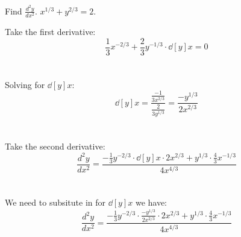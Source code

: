 \documentclass[nooutcomes,handout]{ximera}
\begin{document}
\begin{problem}

Find $\frac{d^2y}{dx^2}$.  $x^{1/3}+y^{2/3}=2$.
	\begin{freeResponse}	

	Take the first derivative:\\
	 $$\frac{1}{3}x^{-2/3}+\frac{2}{3}y^{-1/3}\cdot \dd[y]{x}=0 $$ \\\\
	Solving for $\dd[y]{x}$:\\
	$$\dd[y]{x}=\frac{\frac{-1}{3x^{2/3}}}{\frac{2}{3y^{1/3}}}=\frac{-y^{1/3}}{2x^{2/3}}$$\\\\
	Take the second derivative:
	$$ \frac{d^2y}{dx^2}= \frac{-\frac{1}{3}y^{-2/3} \cdot \dd[y]{x} \cdot 2x^{2/3}+y^{1/3}\cdot \frac{4}{3}x^{-1/3}}{4x^{4/3}}$$ \\\\
	We need to subsitute in for $\dd[y]{x}$ we have:\\ 
	$$ \frac{d^2y}{dx^2}= \frac{-\frac{1}{3}y^{-2/3} \cdot \frac{-y^{1/3}}{2x^{2/3}}  \cdot 2x^{2/3}+y^{1/3}\cdot \frac{4}{3}x^{-1/3}}{4x^{4/3}}$$ \\\\
	
	
	\end{freeResponse}




\end{problem}
\end{document}
